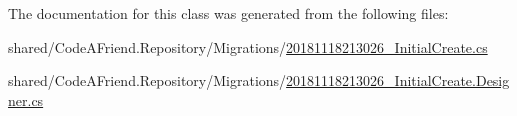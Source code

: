 The documentation for this class was generated from the following files\+:\begin{DoxyCompactItemize}
\item 
shared/\+Code\+A\+Friend.\+Repository/\+Migrations/\mbox{\hyperlink{20181118213026___initial_create_8cs}{20181118213026\+\_\+\+Initial\+Create.\+cs}}\item 
shared/\+Code\+A\+Friend.\+Repository/\+Migrations/\mbox{\hyperlink{20181118213026___initial_create_8_designer_8cs}{20181118213026\+\_\+\+Initial\+Create.\+Designer.\+cs}}\end{DoxyCompactItemize}
